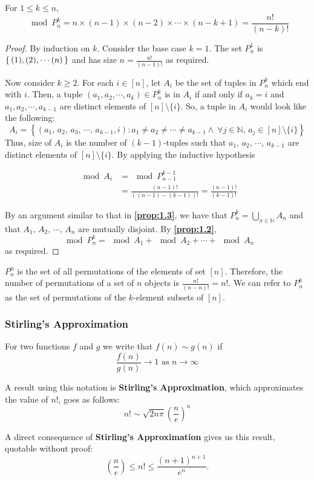 \documentclass[a4paper]{article}
\begin{document}
	\begin{proposition}
		For $1 \leq k \leq n,$ \[\mod{P^k_n} = n \times (n-1) \times (n-2) \times \cdots \times (n-k+1) = \frac{n!}{(n-k)!}\]
	\end{proposition}
	
	\begin{proof}
		By induction on $k$. Consider the base case $k=1$. The set $P^1_n$ is $\set{(1),(2),\cdots (n)}$ and has size $n = \frac{n!}{(n-1)!}$ as required.
		
		Now consider $k \geq 2$. For each $i\in [n]$, let $A_i$ be the set of tuples in $P^k_n$ which end with $i$. Then, a tuple $(a_1, a_2, \cdots, a_k) \in P^k_n$ is in $A_i$ if and only if $a_k = i$ and $a_1, a_2, \cdots, a_{k-1}$ are distinct elements of $[n]\setminus\{i\}$. So, a tuple in $A_i$ would look like the following: \[A_i = \left\{\left(a_1,\, a_2,\, a_3,\, \cdots,\, a_{k-1}, i\right): a_1\neq a_2  \neq \cdots \neq a_{k-1} \wedge\ \forall j\in \mathbb N,\, a_j \in [n]\setminus\{i\}\right\}\] Thus, size of $A_i$ is the number of $(k-1)$-tuples such that $a_1,\,a_2,\,\cdots,\, a_{k-1}$ are distinct elements of $[n]\setminus\{i\}$. By applying the inductive hypothesis 
		
		\begin{align*}
			\mod{A_i} &= \mod{P^{k-1}_{n-1}}\\
					  &= \frac{(n-1)!}{\left((n-1)-(k-1)\right)!} = \frac{(n-1)!}{(k-1)!}
		\end{align*}
		
		By an argument similar to that in \textbf{\autoref{prop:1.3}}, we have that $P^k_n = \bigcup_{n\in\mathbb N} A_n$ and that $A_1,\, A_2,\, \cdots,\, A_n$ are mutually disjoint. By \textbf{\autoref{prop:1.2}}, \[\mod{P^k_n}  = \mod{A_1} + \mod{A_2} + \cdots + \mod{A_n}\] as required.
	\end{proof}

	\begin{note}
		$P^n_n$ is the set of all permutations of the elements of set $[n]$. Therefore, the number of permutations of a set of $n$ objects is $\frac{n!}{(n-n)!} = n!$. We can refer to $P^k_n$ as the set of permutations of the $k$-element subsets of $[n]$.
	\end{note}
	
	\subsubsection{Stirling's Approximation}
	
	For two functions $f$ and $g$ we write that $f(n) \sim g(n)$ if \[\frac{f(n)}{g(n)} \to 1 \text{ as } n\to \infty\]
	
	A result using this notation is \textbf{Stirling's Approximation}, which approximates the value of $n!$, goes as follows: \[n! \sim \sqrt{2n\pi}\left(\frac{n}{e}\right)^n\]
	
	A direct consequence of \textbf{Stirling's Approximation} gives us this result, quotable without proof:
	 \[\left(\frac{n}{e}\right) \leq n! \leq \frac{(n+1)^{n+1}}{e^n}.\]
\end{document}
